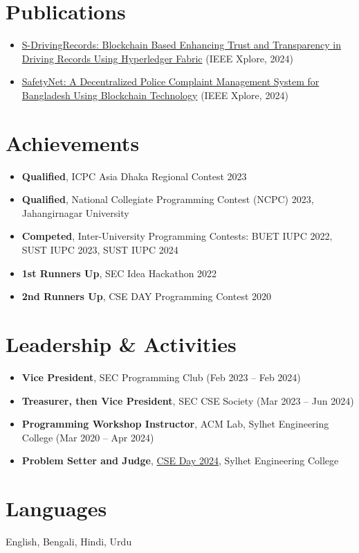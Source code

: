 \documentclass[10pt,letterpaper]{article}
\begin{document}
\section{Publications}
\begin{itemize}
  \item \href{https://ieeexplore.ieee.org/document/10499543}{S-DrivingRecords: Blockchain Based Enhancing Trust and Transparency in Driving Records Using Hyperledger Fabric} (IEEE Xplore, 2024)
  \item \href{https://ieeexplore.ieee.org/document/10499556}{SafetyNet: A Decentralized Police Complaint Management System for Bangladesh Using Blockchain Technology} (IEEE Xplore, 2024)
\end{itemize}

\section{Achievements}
\begin{itemize}
  \item \textbf{Qualified}, ICPC Asia Dhaka Regional Contest 2023
  \item \textbf{Qualified}, National Collegiate Programming Contest (NCPC) 2023, Jahangirnagar University
  \item \textbf{Competed}, Inter-University Programming Contests: BUET IUPC 2022, SUST IUPC 2023, SUST IUPC 2024
  \item \textbf{1st Runners Up}, SEC Idea Hackathon 2022
  \item \textbf{2nd Runners Up}, CSE DAY Programming Contest 2020
\end{itemize}

\section{Leadership \& Activities}
\begin{itemize}
  \item \textbf{Vice President}, SEC Programming Club (Feb 2023 -- Feb 2024)
  \item \textbf{Treasurer, then Vice President}, SEC CSE Society (Mar 2023 -- Jun 2024)
  \item \textbf{Programming Workshop Instructor}, ACM Lab, Sylhet Engineering College (Mar 2020 -- Apr 2024)
  \item \textbf{Problem Setter and Judge}, \href{https://lightoj.com/contest/cs}{CSE Day 2024}, Sylhet Engineering College
\end{itemize}

\section{Languages}
English, Bengali, Hindi, Urdu
\end{document}
